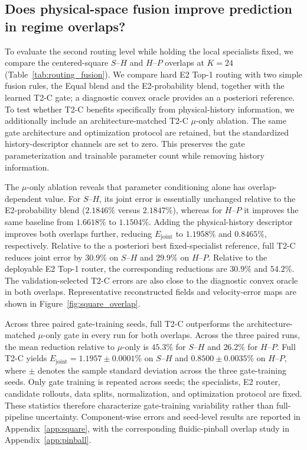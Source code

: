 \documentclass{article}
\begin{document}
\subsection{Does physical-space fusion improve prediction in regime overlaps?}
To evaluate the second routing level while holding the local specialists fixed, we compare the centered-square $S$--$H$ and $H$--$P$ overlaps at $K=24$ (Table~\ref{tab:routing_fusion}). We compare hard E2 Top-1 routing with two simple fusion rules, the Equal blend and the E2-probability blend, together with the learned T2-C gate; a diagnostic convex oracle provides an a posteriori reference. To test whether T2-C benefits specifically from physical-history information, we additionally include an architecture-matched T2-C $\mu$-only ablation. The same gate architecture and optimization protocol are retained, but the standardized history-descriptor channels are set to zero. This preserves the gate parameterization and trainable parameter count while removing history information.


The $\mu$-only ablation reveals that parameter conditioning alone has overlap-dependent value. For $S$--$H$, its joint error is essentially unchanged relative to the E2-probability blend ($2.1846\%$ versus $2.1847\%$), whereas for $H$--$P$ it improves the same baseline from $1.6618\%$ to $1.1504\%$. Adding the physical-history descriptor improves both overlaps further, reducing $E_{\mathrm{joint}}$ to $1.1958\%$ and $0.8465\%$, respectively. Relative to the a posteriori best fixed-specialist reference, full T2-C reduces joint error by $30.9\%$ on $S$--$H$ and $29.9\%$ on $H$--$P$. Relative to the deployable E2 Top-1 router, the corresponding reductions are $30.9\%$ and $54.2\%$. The validation-selected T2-C errors are also close to the diagnostic convex oracle in both overlaps. Representative reconstructed fields and velocity-error maps are shown in Figure~\ref{fig:square_overlap}.

Across three paired gate-training seeds, full T2-C outperforms the architecture-matched $\mu$-only gate in every run for both overlaps.
Across the three paired runs, the mean reduction relative to $\mu$-only is $45.3\%$ for $S$--$H$ and $26.2\%$ for $H$--$P$. Full T2-C yields
$E_{\mathrm{joint}}=1.1957\pm0.0001\%$ on $S$--$H$ and $0.8500\pm0.0035\%$ on $H$--$P$, where $\pm$ denotes the sample standard
deviation across the three gate-training seeds. Only gate training is repeated across seeds; the specialists, E2 router, candidate rollouts, data splits, normalization, and optimization protocol are fixed. These statistics therefore characterize gate-training variability rather than full-pipeline uncertainty. Component-wise errors and seed-level results are reported in Appendix~\ref{app:square}, with the corresponding fluidic-pinball overlap study in Appendix~\ref{app:pinball}.
\end{document}
